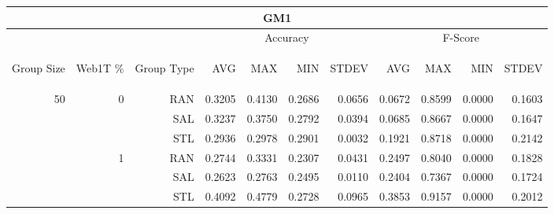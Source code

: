 \begin{center}
\begin{table}[htbp]
\begin{tabular}{ | r | r | r | r | r | r | r | r | r | r | r |}
\hline
\multicolumn{11}{|c|}{GM1}\\
\hline
 & & & \multicolumn{4}{|c|}{Accuracy} & \multicolumn{4}{|c|}{F-Score}\\ \cline{4-11}
\begin{sideways}Group Size\end{sideways} & \begin{sideways}Web1T \%\end{sideways} & \begin{sideways}Group Type\end{sideways} & \begin{sideways}AVG\end{sideways} & \begin{sideways}MAX\end{sideways} & \begin{sideways}MIN\end{sideways} & \begin{sideways}STDEV\end{sideways} & \begin{sideways}AVG\end{sideways} & \begin{sideways}MAX\end{sideways} & \begin{sideways}MIN\end{sideways} & \begin{sideways}STDEV\end{sideways}\\
\hline
\multirow{18}{*}{50}
 & \multirow{3}{*}{0} & RAN & 0.3205 & 0.4130 & 0.2686 & 0.0656 & 0.0672 & 0.8599 & 0.0000 & 0.1603\\ \cline{3-11}
 &   & SAL & 0.3237 & 0.3750 & 0.2792 & 0.0394 & 0.0685 & 0.8667 & 0.0000 & 0.1647\\ \cline{3-11}
 &   & STL & 0.2936 & 0.2978 & 0.2901 & 0.0032 & 0.1921 & 0.8718 & 0.0000 & 0.2142\\ \cline{2-11}
 & \multirow{3}{*}{1} & RAN & 0.2744 & 0.3331 & 0.2307 & 0.0431 & 0.2497 & 0.8040 & 0.0000 & 0.1828\\ \cline{3-11}
 &   & SAL & 0.2623 & 0.2763 & 0.2495 & 0.0110 & 0.2404 & 0.7367 & 0.0000 & 0.1724\\ \cline{3-11}
 &   & STL & 0.4092 & 0.4779 & 0.2728 & 0.0965 & 0.3853 & 0.9157 & 0.0000 & 0.2012\\ \cline{2-11}

\end{tabular}
\end{table}
\end{center}
